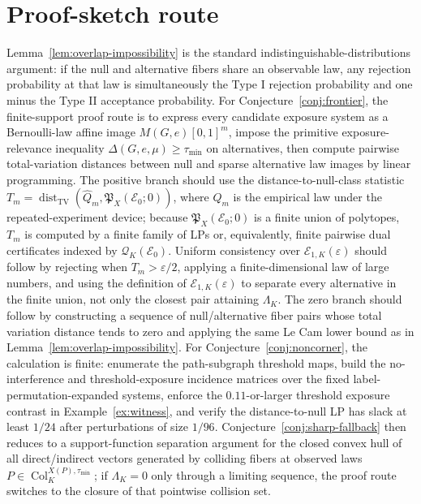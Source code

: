 \documentclass[11pt]{article}
\theoremstyle{definition}
\theoremstyle{plain}
\theoremstyle{remark}
\begin{document}
\section{Proof-sketch route}
Lemma~\ref{lem:overlap-impossibility} is the standard indistinguishable-distributions argument: if the null and alternative fibers share an observable law, any rejection probability at that law is simultaneously the Type I rejection probability and one minus the Type II acceptance probability.  For Conjecture~\ref{conj:frontier}, the finite-support proof route is to express every candidate exposure system as a Bernoulli-law affine image \(M(G,e)[0,1]^m\), impose the primitive exposure-relevance inequality \(\Delta(G,e,\mu)\ge\tau_{\min}\) on alternatives, then compute pairwise total-variation distances between null and sparse alternative law images by linear programming.  The positive branch should use the distance-to-null-class statistic \(T_m=\operatorname{dist}_{\mathrm{TV}}(\widehat Q_m,\mathfrak P_X(\mathcal E_0;0))\), where \(\widehat Q_m\) is the empirical law under the repeated-experiment device; because \(\mathfrak P_X(\mathcal E_0;0)\) is a finite union of polytopes, \(T_m\) is computed by a finite family of LPs or, equivalently, finite pairwise dual certificates indexed by \(\mathcal Q_K(\mathcal E_0)\).  Uniform consistency over \(\mathcal E_{1,K}(\varepsilon)\) should follow by rejecting when \(T_m>\varepsilon/2\), applying a finite-dimensional law of large numbers, and using the definition of \(\mathcal E_{1,K}(\varepsilon)\) to separate every alternative in the finite union, not only the closest pair attaining \(\Lambda_K\).  The zero branch should follow by constructing a sequence of null/alternative fiber pairs whose total variation distance tends to zero and applying the same Le Cam lower bound as in Lemma~\ref{lem:overlap-impossibility}.  For Conjecture~\ref{conj:noncorner}, the calculation is finite: enumerate the path-subgraph threshold maps, build the no-interference and threshold-exposure incidence matrices over the fixed label-permutation-expanded systems, enforce the \(0.11\)-or-larger threshold exposure contrast in Example~\ref{ex:witness}, and verify the distance-to-null LP has slack at least \(1/24\) after perturbations of size \(1/96\).  Conjecture~\ref{conj:sharp-fallback} then reduces to a support-function separation argument for the closed convex hull of all direct/indirect vectors generated by colliding fibers at observed laws \(P\in\operatorname{Col}_{K}^{X(P),\tau_{\min}}\); if \(\Lambda_K=0\) only through a limiting sequence, the proof route switches to the closure of that pointwise collision set.
\end{document}
